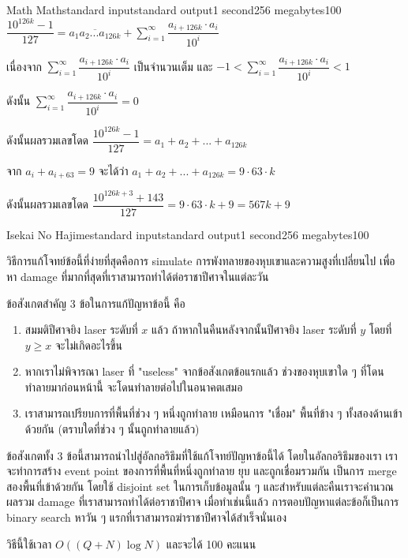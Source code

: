 \documentclass[11pt,a4paper]{article}
\begin{document}
\begin{problem}{Math Math}{standard input}{standard output}{1 second}{256 megabytes}{100}
$\dfrac{10^{126k}-1}{127} = \overline{a_1a_2...a_{126k}} + \sum_{i = 1}^{\infty}\dfrac{a_{i+126k}\cdot a_i}{10^i}$

เนื่องจาก $\sum_{i = 1}^{\infty}\dfrac{a_{i+126k}\cdot a_i}{10^i}$ เป็นจำนวนเต็ม และ $-1< \sum_{i = 1}^{\infty}\dfrac{a_{i+126k}\cdot a_i}{10^i} < 1$

ดังนั้น $\sum_{i = 1}^{\infty}\dfrac{a_{i+126k}\cdot a_i}{10^i} = 0$

ดังนั้นผลรวมเลขโดด $\dfrac{10^{126k}-1}{127} = a_1 + a_2 + ...+ a_{126k}$

จาก $a_i + a_{i+63} = 9$ จะได้ว่า $a_1 + a_2 + ...+ a_{126k} = 9\cdot 63\cdot k$

ดังนั้นผลรวมเลขโดด $\dfrac{10^{126k+3}+143}{127} = 9\cdot 63 \cdot k + 9 = 567k + 9$ 
\end{problem}

\pagebreak

\begin{problem}{Isekai No Hajime}{standard input}{standard output}{1 second}{256 megabytes}{100}

วิธีการแก้โจทย์ข้อนี้ที่ง่ายที่สุดคือการ simulate การพังทลายของหุบเขาและความสูงที่เปลี่ยนไป เพื่อหา damage ที่มากที่สุดที่เราสามารถทำได้ต่อราชาปีศาจในแต่ละวัน

ข้อสังเกตสำคัญ 3 ข้อในการแก้ปัญหาข้อนี้ คือ
\begin{enumerate}
\item สมมติปีศาจยิง laser ระดับที่ $x$ แล้ว ถ้าหากในคืนหลังจากนั้นปีศาจยิง laser ระดับที่ $y$ โดยที่ $y \geq x$ จะไม่เกิดอะไรขึ้น
\item  หากเราไม่พิจารณา laser ที่ "useless" จากข้อสังเกตข้อแรกแล้ว ช่วงของหุบเขาใด ๆ ที่โดนทำลายมาก่อนหน้านี้ จะโดนทำลายต่อไปในอนาคตเสมอ
\item  เราสามารถเปรียบการที่พื้นที่ช่วง ๆ หนึ่งถูกทำลาย เหมือนการ "เชื่อม" พื้นที่ข้าง ๆ ทั้งสองด้านเข้าด้วยกัน (ตราบใดที่ช่วง ๆ นั้นถูกทำลายแล้ว) 
\end{enumerate}

ข้อสังเกตทั้ง 3 ข้อนี้สามารถนำไปสู่อัลกอริธึมที่ใช้แก้โจทย์ปัญหาข้อนี้ได้ โดยในอัลกอริธึมของเรา เราจะทำการสร้าง event point ของการที่พื้นที่หนึ่งถูกทำลาย ยุบ และถูกเชื่อมรวมกัน เป็นการ merge สองพื้นที่เข้าด้วยกัน โดยใช้ disjoint set ในการเก็บข้อมูลนั้น ๆ และสำหรับแต่ละคืนเราจะคำนวณผลรวม damage ที่เราสามารถทำได้ต่อราชาปีศาจ เมื่อทำเช่นนี้แล้ว การตอบปัญหาแต่ละข้อก็เป็นการ binary search หาวัน ๆ แรกที่เราสามารถฆ่าราชาปีศาจได้สำเร็จนั่นเอง

วิธีนี้ใช้เวลา $O((Q+N) \log N)$ และจะได้ 100 คะแนน

\end{problem}
\end{document}
